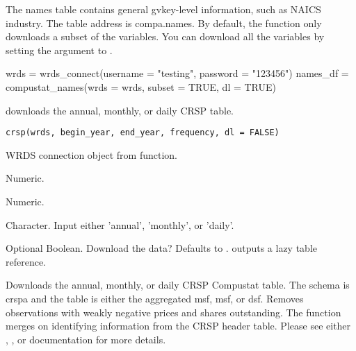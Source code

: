 \documentclass[a4paper]{book}
\begin{document}
%
\begin{Details}\relax
The names table contains general gvkey-level information, such as NAICS industry. The table
address is compa.names. By default, the function only downloads a subset of the variables.
You can download all the variables by setting the  argument to .
\end{Details}
%
\begin{Examples}
\begin{ExampleCode}
wrds = wrds_connect(username = "testing", password = "123456")
names_df = compustat_names(wrds = wrds, subset = TRUE, dl = TRUE)
\end{ExampleCode}
\end{Examples}
%
\begin{Description}\relax
{} downloads the annual, monthly, or daily CRSP table.
\end{Description}
%
\begin{Usage}
\begin{verbatim}
crsp(wrds, begin_year, end_year, frequency, dl = FALSE)
\end{verbatim}
\end{Usage}
%
\begin{Arguments}
\begin{ldescription}
\item[\code{wrds}] WRDS connection object from  function.

\item[\code{begin\_year}] Numeric.

\item[\code{end\_year}] Numeric.

\item[\code{frequency}] Character. Input either 'annual', 'monthly', or 'daily'.

\item[\code{dl}] Optional Boolean. Download the data? Defaults to .  outputs a
lazy  table reference.
\end{ldescription}
\end{Arguments}
%
\begin{Details}\relax
Downloads the annual, monthly, or daily CRSP Compustat table. The schema is crspa and the
table is either the aggregated msf, msf, or dsf. Removes observations with weakly negative prices
and shares outstanding. The function merges on identifying information from the
CRSP header table. Please see either , , or
 documentation for more details.
\end{Details}
\end{document}
